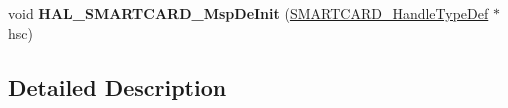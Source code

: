 \begin{DoxyCompactItemize}
\item 
void {\bfseries H\+A\+L\+\_\+\+S\+M\+A\+R\+T\+C\+A\+R\+D\+\_\+\+Msp\+De\+Init} (\hyperlink{struct_s_m_a_r_t_c_a_r_d___handle_type_def}{S\+M\+A\+R\+T\+C\+A\+R\+D\+\_\+\+Handle\+Type\+Def} $\ast$hsc)\hypertarget{group___s_m_a_r_t_c_a_r_d___exported___functions___group1_gaf8e8fa8ca8058656fdd091880424565a}{}\label{group___s_m_a_r_t_c_a_r_d___exported___functions___group1_gaf8e8fa8ca8058656fdd091880424565a}

\end{DoxyCompactItemize}


\subsection{Detailed Description}
